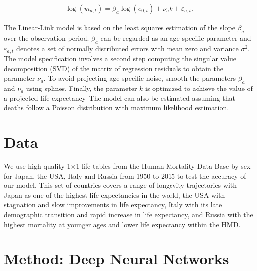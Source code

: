 \documentclass[a4,11pt]{article}
\begin{document}
	\begin{equation}
	\label{eq.LinearLink}
	\begin{array}{l}
	\log{\left(m_{a,t}\right)}=\beta_{a} \log(e_{0,t})+\nu_{a} k+\varepsilon_{a,t}.
	\end{array}
	\end{equation}
	
The Linear-Link model is based on the least squares estimation of the slope $\beta_a$ over the observation period. $\beta_a$ can be regarded as an age-specific parameter and $\varepsilon_{a,t}$ denotes a set of normally distributed errors with mean zero and variance $\sigma^{2}$. The model specification involves a second step computing the singular value decomposition (SVD) of the matrix of regression residuals to obtain the parameter $\nu_{a}$. To avoid projecting age specific noise, \citet{PascariuLL} smooth the parameters $\beta_{a}$ and $\nu_{a}$ using splines. Finally, the parameter $k$ is optimized to achieve the value of a projected life expectancy. The model can also be estimated assuming that deaths follow a Poisson distribution with maximum likelihood estimation. 


\section{Data}
We use high quality 1$\times$1 life tables from the Human Mortality Data Base \citep{HM} by sex for Japan, the USA, Italy and Russia from 1950 to 2015 to test the accuracy of our model. This set of countries covers a range of longevity trajectories with Japan as one of the highest life expectancies in the world, the USA with stagnation and slow improvements in life expectancy, Italy with its late demographic transition and rapid increase in life expectancy, and Russia with the highest mortality at younger ages and lower life expectancy within the HMD.

\section{Method: Deep Neural Networks}
\label{sec:2}
\end{document}
